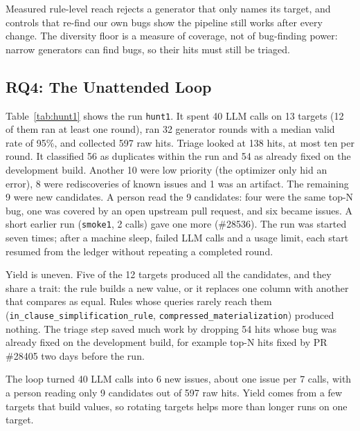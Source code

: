 \begin{observation}
Measured rule-level reach rejects a generator that only names its target, and controls that re-find our own bugs show
the pipeline still works after every change. The diversity floor is a measure of coverage, not of bug-finding power:
narrow generators can find bugs, so their hits must still be triaged.
\end{observation}

\subsection{RQ4: The Unattended Loop}
\label{sec:eval-loop}



Table~\ref{tab:hunt1} shows the run \texttt{hunt1}. It spent 40 LLM calls on 13 targets (12 of them ran at least one
round), ran 32 generator rounds with a median valid rate of 95\%, and collected 597 raw hits. Triage looked at 138 hits, at most ten per round. It classified 56 as duplicates within the run and 54 as already fixed on the development build. Another 10 were low priority (the optimizer only hid an error), 8 were rediscoveries of known issues and 1 was an artifact. The remaining 9 were new candidates. A person read the 9 candidates: four were the same top-N bug, one was covered by an open upstream
pull request, and six became issues. A short earlier run (\texttt{smoke1}, 2 calls) gave one more (\#28536). The run was started seven times; after a machine sleep, failed LLM calls and a usage limit, each start resumed from the ledger without repeating a completed round.

Yield is uneven. Five of the 12 targets produced all the candidates, and they share a trait: the rule builds a new
value, or it replaces one column with another that compares as equal. Rules whose queries rarely reach them
(\texttt{in\_clause\_simplification\_rule}, \texttt{compressed\_materialization}) produced nothing. The triage step saved much work by dropping 54 hits whose bug was already fixed on the development build, for example top-N hits fixed by PR \#28405 two days before the run.

\begin{observation}
The loop turned 40 LLM calls into 6 new issues, about one issue per 7 calls, with a person reading only 9
candidates out of 597 raw hits. Yield comes from a few targets that build values, so rotating targets helps more than
longer runs on one target.
\end{observation}
